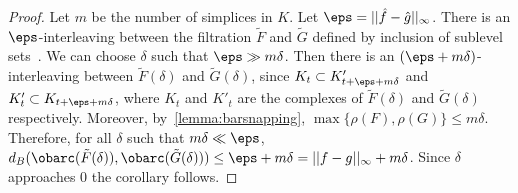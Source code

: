 \begin{proof}

    
    Let $m$ be the number of simplices in $K$. Let $\eps = ||\hat{f}-\hat{g}||_\infty$. There is an $\eps$-interleaving between the filtration $\tilde{F}$ and $\tilde{G}$ defined by inclusion of sublevel sets~\cite{Cohen-SteinerEdelsbrunnerHarer2005,ChazalCohenSteinerGlisse2009}. We can choose $\delta$ such that $\eps \gg m\delta$.
    Then there is an $(\eps+m\delta)$-interleaving between $\tilde{F}(\delta)$ and $\tilde{G}(\delta)$, since $K_{t} \subset K'_{t+\eps+m\delta}$ and $K'_{t} \subset K_{t+\eps+m\delta}$, where $K_t$ and $K'_t$ are the complexes of $\tilde{F}(\delta)$ and $\tilde{G}(\delta)$ respectively. Moreover, by~\cref{lemma:barsnapping}, $\max\{\rho(F), \rho(G)\} \leq m\delta$. Therefore, for all $\delta$ such that $m\delta \ll \eps$, $d_B ( {\obarc(\tilde{F}(\delta))}, {\obarc(\tilde{G}(\delta))} )  \leq \eps+m\delta = ||f-g||_\infty+m\delta$. Since $\delta$ approaches 0 the corollary follows. 
\end{proof}







